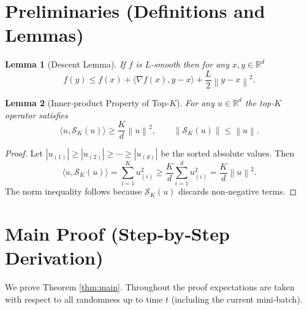 \documentclass{article}
\newtheorem{lemma}{Lemma}
\newcommand{\R}{\mathbb{R}}
\newcommand{\norm}[1]{\left\|#1\right\|}
\newcommand{\ip}[2]{\langle #1,#2\rangle}
\newcommand{\topk}[1]{\mathcal{S}_K(#1)}
\begin{document}
\section*{Preliminaries (Definitions and Lemmas)}
\begin{lemma}[Descent Lemma]\label{lem:descent}
If \(f\) is \(L\)-smooth then for any \(x,y\in\R^{d}\)
\[
f(y)\le f(x)+\ip{\nabla f(x)}{y-x}+\frac{L}{2}\norm{y-x}^2 .
\]
\end{lemma}
\begin{lemma}[Inner‑product Property of Top‑\(K\)]\label{lem:inner}
For any \(u\in\R^{d}\) the top‑\(K\) operator satisfies
\[
\ip{u}{\topk{u}}\ge\frac{K}{d}\norm{u}^2,
\qquad
\norm{\topk{u}}\le\norm{u}.
\]
\end{lemma}
\begin{proof}
Let \(|u_{(1)}|\ge |u_{(2)}|\ge\cdots\ge|u_{(d)}|\) be the sorted absolute values.
Then
\[
\ip{u}{\topk{u}}=\sum_{i=1}^{K}u_{(i)}^2\ge
\frac{K}{d}\sum_{i=1}^{d}u_{(i)}^2=\frac{K}{d}\norm{u}^2 .
\]
The norm inequality follows because \(\topk{u}\) discards non‑negative terms.
\end{proof}

\section*{Main Proof (Step‑by‑Step Derivation)}
We prove Theorem \ref{thm:main}.  Throughout the proof expectations are taken with respect to all randomness up to time \(t\) (including the current mini‑batch).
\end{document}
